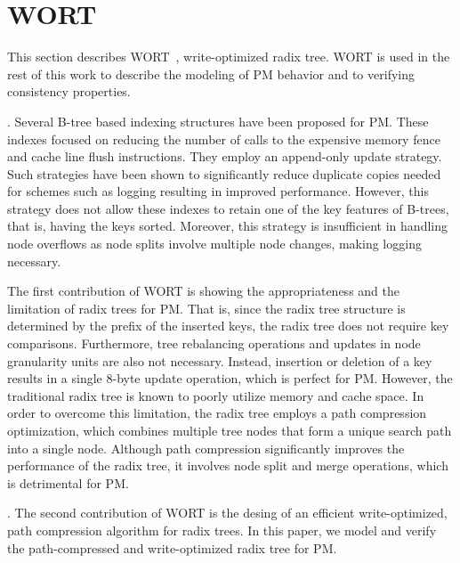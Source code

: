 \section{WORT}

This section describes WORT~\cite{201600}, write-optimized
radix tree. WORT is used in the rest of this work to describe
the modeling of PM behavior and to verifying consistency properties.

. Several B-tree based indexing structures
have been proposed for PM. These indexes focused on reducing the
number of calls to the expensive memory fence and cache line flush
instructions. They employ an append-only update strategy. Such
strategies have been shown to significantly reduce duplicate copies
needed for schemes such as logging resulting in improved performance.
However, this strategy does not allow these indexes to retain one of
the key features of B-trees, that is, having the keys sorted. Moreover,
this strategy is insufficient in handling node overflows as node splits
involve multiple node changes, making logging necessary.

The first contribution of WORT is showing the appropriateness and the
limitation of radix trees for PM. That is, since the radix tree structure
is determined by the prefix of the inserted keys, the radix tree does not
require key comparisons. Furthermore, tree rebalancing operations and
updates in node granularity units are also not necessary. Instead,
insertion or deletion of a key results in a single 8-byte update operation,
which is perfect for PM. However, the traditional radix tree is known
to poorly utilize memory and cache space. In order to overcome this limitation,
the radix tree employs a path compression optimization, which combines
multiple tree nodes that form a unique search path into a single node.
Although path compression significantly improves the performance of the
radix tree, it involves node split and merge operations,
which is detrimental for PM.

. The second contribution of WORT is
the desing of an efficient write-optimized, path compression algorithm for
radix trees. In this paper, we model and verify the path-compressed and
write-optimized radix tree for PM.
